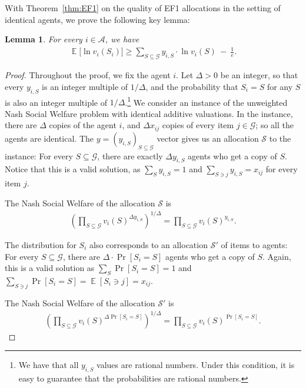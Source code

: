 \documentclass[10pt,a4paper]{article}
\newtheorem{lemma}[theorem]{Lemma}
\theoremstyle{definition}
\theoremstyle{plain}
\newcommand\calS{{\mathcal{S}}}
\newcommand\calA{{\mathcal{A}}}
\newcommand\calG{{\mathcal{G}}}
\DeclareMathOperator{\E}{\mathbb{E}}
\begin{document}
    With Theorem~\ref{thm:EF1} on the quality of EF1 allocations in the setting of identical agents, we prove the following key lemma:
    \begin{lemma}
        For every $i \in \calA$, we have
        \begin{align*}
            \E\big[\ln v_i(S_i)\big] \geq \sum_{S \subseteq \calG} y_{i, S}\cdot \ln v_i(S) \ -\ \frac1e.
        \end{align*}
    \end{lemma}
    \begin{proof}
        Throughout the proof, we fix the agent $i$. Let $\Delta > 0$ be an integer, so that every $y_{i, S}$ is an integer multiple of $1/\Delta$, and the probability that $S_i = S$ for any $S$ is also an integer multiple of $1/\Delta$.\footnote{We have that all $y_{i, S}$ values are rational numbers. Under this condition, it is  easy to guarantee that the probabilities are rational numbers.} We consider an instance of the unweighted Nash Social Welfare problem with identical additive valuations. In the instance, there are $\Delta$ copies of the agent $i$, and $\Delta x_{ij}$ copies of every item $j \in \calG$; so all the agents are identical. The $y = (y_{i, S})_{S \subseteq \calG}$ vector gives us an allocation $\calS$ to the instance: For every $S \subseteq \calG$, there are exactly $\Delta y_{i,S}$ agents who get a copy of $S$.  Notice that this is a valid solution, as $\sum_{S} y_{i, S} = 1$ and $\sum_{S \ni j} y_{i, S} = x_{ij}$ for every item $j$.
        
        The Nash Social Welfare of the allocation $\calS$ is 
        \begin{align*}
            \left(\prod_{S \subseteq \calG} v_i(S)^{\Delta y_{i, S}}\right)^{1/\Delta}  = \prod_{S \subseteq \calG} v_i(S)^{y_{i, S}}.
        \end{align*}
        
        The distribution for $S_i$ also corresponds to an allocation $\calS'$ of items to agents: For every $S \subseteq \calG$, there are $\Delta \cdot \Pr[S_i = S]$ agents who get a copy of $S$. Again, this is a valid solution as $\sum_{S} \Pr[S_i = S] = 1$ and $\sum_{S \ni j} \Pr[S_i = S] = \E[S_i \ni j] = x_{ij}$.
        
        The Nash Social Welfare of the allocation $\calS'$ is 
        \begin{align*}
            \left(\prod_{S \subseteq \calG} v_i(S)^{\Delta \Pr[S_i = S]}\right)^{1/\Delta} = \prod_{S \subseteq \calG} v_i(S)^{\Pr[S_i = S]}.
        \end{align*}
        

\end{proof}
\end{document}
